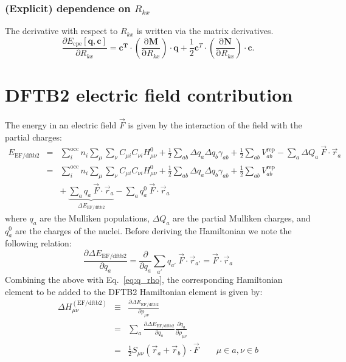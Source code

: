\documentclass{article}
\numberwithin{equation}{section}
\begin{document}
\subsubsection{(Explicit) dependence on $R_{kx}$}
The derivative with respect to $R_{kx}$ is written via the matrix derivatives.
\begin{equation}
    \frac{\partial E_\mathrm{{cpe}}\left[\mathbf{q}, \mathbf{c}\right]}{\partial R_{kx}} = 
    \mathbf{c^T} \cdot \left( \frac{\mathrm{\partial}\mathbf{M}}{\mathrm{\partial}R_{kx}}\right) \cdot \mathbf{q} 
    + \frac{1}{2}\mathbf{c}^T \cdot \left( \frac{\mathrm{\partial}\mathbf{N}}{\mathrm{\partial}R_{kx}}\right) \cdot \mathbf{c}. 
\end{equation}


\clearpage
\section{DFTB2 electric field contribution}
The energy in an electric field $\vec{F}$ is given by the interaction of the field with the partial charges:
\begin{eqnarray}
    E_\mathrm{EF/dftb2} 
    &=& \sum_i^\mathrm{occ} n_i  \sum_\mu \sum_\nu C_{\mu i}  C_{\nu i} H^0_{\mu\nu} + \frac{1}{2} \sum_{ab} \Delta q_a \Delta q_b \gamma_{ab}+ \frac{1}{2} \sum_{ab} V^\mathrm{rep}_{ab} - \sum_a \Delta Q_a\ \vec{F} \cdot \vec{r}_a\nonumber\\
    &=& \sum_i^\mathrm{occ} n_i  \sum_\mu \sum_\nu C_{\mu i}  C_{\nu i} H^0_{\mu\nu} + \frac{1}{2} \sum_{ab} \Delta q_a \Delta q_b \gamma_{ab}+ \frac{1}{2} \sum_{ab} V^\mathrm{rep}_{ab} \\
    &&+\ \underbrace{\sum_a q_a\ \vec{F} \cdot \vec{r}_a}_{\Delta E_{\mathrm{EF/dftb2}}}\label{eq:dftb_ef_energy} - \sum_a q^0_a\ \vec{F} \cdot \vec{r}_a
\end{eqnarray}
where $q_a$ are the Mulliken populations, $\Delta Q_a$ are the partial Mulliken charges, and $q^0_a$ are the charges of the nuclei.
Before deriving the Hamiltonian we note the following relation:
\begin{equation}
    \frac{\partial \Delta E_{\mathrm{EF/dftb2}}}{\partial q_a}
    = \frac{\partial}{\partial q_a} \sum_{a'} q_{a'}\ \vec{F} \cdot \vec{r}_{a'} = \vec{F} \cdot \vec{r}_a
\end{equation}
Combining the above with Eq.~\ref{eq:q_rho}, the corresponding Hamiltonian element to be added to the DFTB2 Hamiltonian element is given by:
\begin{eqnarray}
    \Delta H_{\mu\nu}^{\mathrm{(EF/dftb2)}} 
    &\equiv& \frac{\partial \Delta  E_{\mathrm{EF/dftb2}}}{\partial \rho_{\mu\nu}}\nonumber\\
    &=&  \sum_a \frac{\partial \Delta  E_{\mathrm{EF/dftb2}}}{\partial q_a} 
     \frac{\partial q_a}{\partial \rho_{\mu\nu}}\nonumber\\
     &=& \frac{1}{2} S_{\mu\nu} \left( \vec{r}_a + \vec{r}_b
 \right) \cdot \vec{F}  \qquad \mu \in a, \nu \in b
\end{eqnarray}
\end{document}
